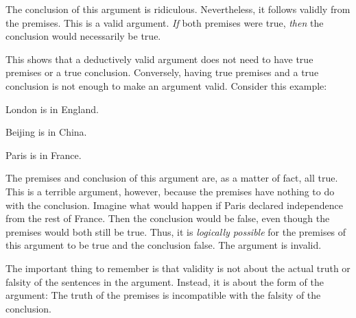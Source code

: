 The conclusion of this argument is ridiculous. Nevertheless, it follows validly from the premises. This is a valid argument. \emph{If} both premises were true, \emph{then} the conclusion would necessarily be true.

This shows that a deductively valid argument does not need to have true premises or a true conclusion. Conversely, having true premises and a true conclusion is not enough to make an argument valid. Consider this example:

\begin{earg}
\item[] London is in England.
\item[] Beijing is in China.
\item[\therefore] Paris is in France.
\end{earg}

The premises and conclusion of this argument are, as a matter of fact, all true. This is a terrible argument, however, because the premises have nothing to do with the conclusion. Imagine what would happen if Paris declared independence from the rest of France. Then the conclusion would be false, even though the premises would both still be true. Thus, it is \emph{logically possible} for the premises of this argument to be true and the conclusion false. The argument is invalid.

The important thing to remember is that validity is not about the actual truth or falsity of the sentences in the argument. Instead, it is about the form of the argument: The truth of the premises is incompatible with the falsity of the conclusion.








